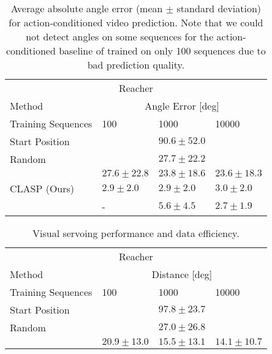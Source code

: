 \documentclass{article} %
\begin{document}
\begin{table}
\centering
  \caption{Average absolute angle error (mean $\pm$ standard deviation) for action-conditioned video prediction. Note that we could not detect angles on some sequences for the action-conditioned baseline of \cite{Oh:2015:AVP:2969442.2969560} trained on only 100 sequences due to bad prediction quality.}
  \centering
  \begin{tabular}{llll}
    \toprule
    \multicolumn{4}{c}{Reacher}   \\
    \cmidrule(r){1-4} 
    Method & \multicolumn{3}{c}{Angle Error [deg]}  \\
    \cmidrule(r){1-4}
    Training Sequences & \SI{100}{} & \SI{1000}{} & \SI{10000}{} \\
    \midrule
    Start Position & \multicolumn{3}{c}{\sout{\hfill} $90.6\pm 52.0$ \sout{\hfill}}  \\
    Random & \multicolumn{3}{c}{\sout{\hfill} $27.7\pm 22.2$ \sout{\hfill}} \\
    \cite{denton18stochastic}& $27.6\pm 22.8$ & $23.8\pm 18.6$ & $23.6\pm 18.3$ \\
    CLASP (Ours) & $\bm{2.9}\pm \bm{2.0}$ & $\bm{2.9}\pm \bm{2.0}$ & $3.0\pm 2.0$  \\
    \midrule
    \cite{Oh:2015:AVP:2969442.2969560} & - & $5.6\pm 4.5$ & $\bm{2.7}\pm \bm{1.9}$  \\
    \bottomrule
  \end{tabular}
  \label{tab:pred}
\end{table}\begin{table}
\centering
  \caption{Visual servoing performance and data efficiency.}
  \label{tab:vs}
  \centering
\begin{tabular}{llll}
    \toprule
    \multicolumn{4}{c}{Reacher}   \\
    \cmidrule(r){1-4} 
    Method                             & \multicolumn{3}{c}{Distance [deg]}  \\
    \cmidrule(r){1-4}
    Training Sequences                 & \SI{100}{} & \SI{1000}{} & \SI{10000}{} \\
    \midrule
    Start Position                     & \multicolumn{3}{c}{\sout{\hfill} $97.8\pm 23.7$ \sout{\hfill}}  \\
    Random                             & \multicolumn{3}{c}{\sout{\hfill} $27.0\pm 26.8$ \sout{\hfill}} \\
    \cite{denton18stochastic}          & $20.9\pm 13.0$         & $15.5\pm 13.1$         & $14.1\pm 10.7$ \\

\end{tabular}
\end{table}
\end{document}
